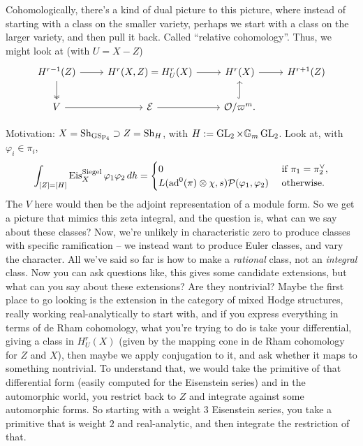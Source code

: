 \documentclass[reqno]{amsart} 
\begin{document}
Cohomologically, there's a kind of dual picture to this picture, where instead of starting with a class on the smaller variety, perhaps we start with a class on the larger variety, and then pull it back.  Called ``relative cohomology''.  Thus, we might look at (with $U = X - Z$)
\begin{equation*}
  \begin{tikzcd}
    H^{r-1}(Z) \arrow[r] \arrow[d, two heads] & H^r(X,Z) = H_U^r(X) \arrow[r] & H^r(X) \arrow[r] & H^{r+1}(Z) \\
    V \arrow[r] & \mathcal{E} \arrow[r] & \mathcal{O}/\varpi^m \arrow[u, hook].
  \end{tikzcd}
\end{equation*}

Motivation: $X = \mathrm{Sh}_{\operatorname{GSp}_4} \supset Z = \mathrm{Sh}_{H}$, with $H := \operatorname{GL}_2 \times \mathbb{G}_m \operatorname{GL}_2$.  Look at, with $\varphi_i \in \pi_i$,
\begin{equation*}
  \int_{[Z] =[H]}
  \operatorname{Eis}_X^{\mathrm{Siegel}} \varphi_1 \varphi_2 \, d h
  =
  \begin{cases}
    0 &  \text{ if } \pi_1 = \pi_2^\vee , \\
    L(\operatorname{ad}^0(\pi) \otimes \chi, s) \mathcal{P}(\varphi_1, \varphi_2)     & \text{ otherwise.}
  \end{cases}
\end{equation*}
The $V$ here would then be the adjoint representation of a module form.  So we get a picture that mimics this zeta integral, and the question is, what can we say about these classes?  Now, we're unlikely in characteristic zero to produce classes with specific ramification -- we instead want to produce Euler classes, and vary the character.  All we've said so far is how to make a \emph{rational} class, not an \emph{integral} class.  Now you can ask questions like, this gives some candidate extensions, but what can you say about these extensions?  Are they nontrivial?  Maybe the first place to go looking is the extension in the category of mixed Hodge structures, really working real-analytically to start with, and if you express everything in terms of de Rham cohomology, what you're trying to do is take your differential, giving a class in $H_U^r(X)$ (given by the mapping cone in de Rham cohomology for $Z$ and $X$), then maybe we apply conjugation to it, and ask whether it maps to something nontrivial.  To understand that, we would take the primitive of that differential form (easily computed for the Eisenstein series) and in the automorphic world, you restrict back to $Z$ and integrate against some automorphic forms.  So starting with a weight $3$ Eisenstein series, you take a primitive that is weight $2$ and real-analytic, and then integrate the restriction of that.
\end{document}
